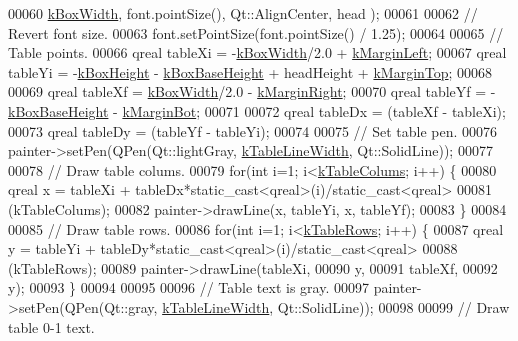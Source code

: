 \begin{DoxyCode}
00060                     \hyperlink{class_info_line_af71f2b91ea77398bd770b973b71e2896}{kBoxWidth}, font.pointSize(), Qt::AlignCenter, head );
00061 
00062   \textcolor{comment}{// Revert font size.}
00063   font.setPointSize(font.pointSize() / 1.25);
00064 
00065   \textcolor{comment}{// Table points.}
00066   qreal tableXi = -\hyperlink{class_info_line_af71f2b91ea77398bd770b973b71e2896}{kBoxWidth}/2.0 + \hyperlink{class_info_line_a480271b6a9d683ab36c0c6ef142a461f}{kMarginLeft};
00067   qreal tableYi = -\hyperlink{class_info_line_a279cafcac8d844a00bd27dde524102dd}{kBoxHeight} - \hyperlink{class_info_line_ab332e0b1c83e5ab8f551e3f39b2dfc55}{kBoxBaseHeight} + headHeight + 
      \hyperlink{class_info_line_ab0b7394c3710ba9d88da13a484069302}{kMarginTop};
00068 
00069   qreal tableXf = \hyperlink{class_info_line_af71f2b91ea77398bd770b973b71e2896}{kBoxWidth}/2.0 - \hyperlink{class_info_line_af945da2dfe0437816b9e1fe8e6668692}{kMarginRight};
00070   qreal tableYf = - \hyperlink{class_info_line_ab332e0b1c83e5ab8f551e3f39b2dfc55}{kBoxBaseHeight} - \hyperlink{class_info_line_a82acf816389449ddce739e8abb6e0fdc}{kMarginBot};
00071 
00072   qreal tableDx = (tableXf - tableXi);
00073   qreal tableDy = (tableYf - tableYi);
00074 
00075   \textcolor{comment}{// Set table pen.}
00076   painter->setPen(QPen(Qt::lightGray, \hyperlink{class_info_line_a9d03a53c9bca9357e502a1e423ff4541}{kTableLineWidth}, Qt::SolidLine));
00077 
00078   \textcolor{comment}{// Draw table colums.}
00079   \textcolor{keywordflow}{for}(\textcolor{keywordtype}{int} i=1; i<\hyperlink{class_info_line_a9fc071b08eb913cf3afc623835ad2fd8}{kTableColums}; i++) \{
00080     qreal x = tableXi + tableDx*\textcolor{keyword}{static\_cast<}qreal\textcolor{keyword}{>}(i)/static\_cast<qreal>
00081               (kTableColums);
00082     painter->drawLine(x, tableYi, x, tableYf);
00083   \}
00084 
00085   \textcolor{comment}{// Draw table rows.}
00086   \textcolor{keywordflow}{for}(\textcolor{keywordtype}{int} i=1; i<\hyperlink{class_info_line_a95cdc7a95cde6db7c6faceda995d26b9}{kTableRows}; i++) \{
00087     qreal y = tableYi + tableDy*\textcolor{keyword}{static\_cast<}qreal\textcolor{keyword}{>}(i)/static\_cast<qreal>
00088               (kTableRows);
00089     painter->drawLine(tableXi,
00090                       y,
00091                       tableXf,
00092                       y);
00093   \}
00094 
00095 
00096   \textcolor{comment}{// Table text is gray.}
00097   painter->setPen(QPen(Qt::gray, \hyperlink{class_info_line_a9d03a53c9bca9357e502a1e423ff4541}{kTableLineWidth}, Qt::SolidLine));
00098 
00099   \textcolor{comment}{// Draw table 0-1 text.}

\end{DoxyCode}
